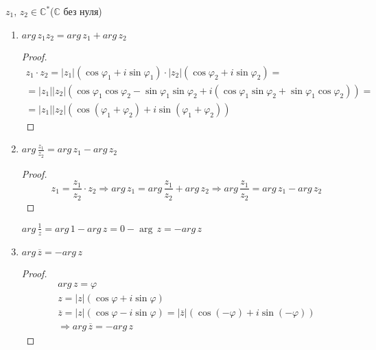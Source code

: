 $z_1,\, z_2 \in \mathbb{C}^*$($\mathbb{C}$ без нуля)
\begin{enumerate}
    \item $arg\,z_1z_2 = arg\,z_1 + arg\,z_2$
    \begin{proof}
        \begin{gather*}
            z_1 \cdot z_2 = |z_1|(\cos\varphi_1 + i\sin\varphi_1) \cdot |z_2|(\cos\varphi_2 + i\sin\varphi_2) =  \\
            = |z_1||z_2|(\cos\varphi_1\cos\varphi_2 - \sin\varphi_1\sin\varphi_2 + i(\cos\varphi_1\sin\varphi_2 + \sin\varphi_1\cos\varphi_2)) = \\
            = |z_1||z_2|(\cos(\varphi_1 + \varphi_2) + i\sin(\varphi_1 + \varphi_2))
        \end{gather*}
    \end{proof}
    \item $arg\,\frac{z_1}{z_2} = arg\,z_1 - arg\,z_2$
    \begin{proof}  
        \[ z_1 = \frac{z_1}{z_2} \cdot z_2 \Rightarrow arg\,z_1 = arg\,\frac{z_1}{z_2} + arg\,z_2 \Rightarrow arg\,\frac{z_1}{z_2} = arg\,z_1 - arg\,z_2 \]
    \end{proof}
    \begin{notice}
        $arg\,\frac{1}{z} = arg\,1 - arg\,z = 0 - \arg\,z = -arg\,z$
    \end{notice}
    \item $arg\,\overline{z} = -arg\,z$
    \begin{proof}
        \begin{gather*}
            arg\,z = \varphi \\
            z = |z|(\cos\varphi + i\sin\varphi) \\
            \overline{z} = |z|(\cos\varphi - i\sin\varphi) = |\overline{z}|(\cos(-\varphi) + i\sin(-\varphi)) \\
            \Rightarrow arg\,\overline{z} = -arg\,z
        \end{gather*}
    \end{proof}
\end{enumerate}